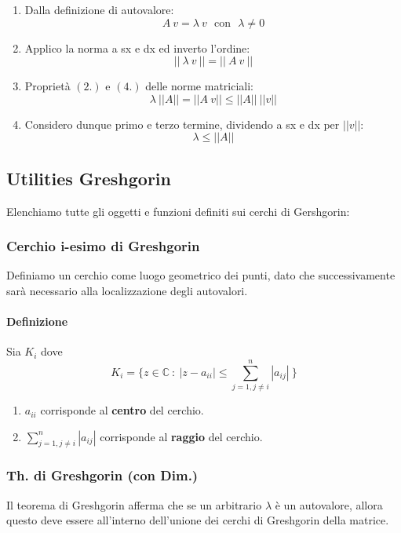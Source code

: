 \documentclass{article}
\begin{document}
\begin{enumerate}
    \item Dalla definizione di autovalore:
    \[ A\:v = \lambda\:v \:\:\: \text{con} \:\:\: \lambda \neq0\]
    \item Applico la norma a sx e dx ed inverto l'ordine:
    \[ ||\:\lambda\:v\:|| = ||\:A\:v\:||\]
    \item Proprietà $(2.)$ e $(4.)$ delle norme matriciali:
    \[ \lambda\:||A|| = ||A\:v|| \leq ||A|| \:|| v || \]
    \item Considero dunque primo e terzo termine, dividendo a sx e dx per $||v||$:
    \[ \boxed{\lambda \leq ||A||} \]
\end{enumerate}

\newpage

\subsection{Utilities Greshgorin}

Elenchiamo tutte gli oggetti e funzioni definiti sui cerchi di Gershgorin:

\subsubsection{Cerchio i-esimo di Greshgorin}

Definiamo un cerchio come luogo geometrico dei punti, dato che successivamente sarà necessario alla localizzazione degli autovalori.

\paragraph{Definizione} Sia $K_{i}$ dove
\[ \boxed{K_{i} = \{ z \in \mathbb{C} \: : \: |z-a_{ii}| \leq \sum_{j=1, j\neq i}^{n}|a_{ij}|  \: \} }\]

\begin{enumerate}
    \item $a_{ii}$ corrisponde al \textbf{centro} del cerchio.
    \item $\sum_{j=1, j\neq i}^{n}|a_{ij}|$ corrisponde al \textbf{raggio} del cerchio.
\end{enumerate}

\subsubsection{Th. di Greshgorin (con Dim.)}

Il teorema di Greshgorin afferma che se un arbitrario $\lambda$ è un autovalore, allora questo deve essere all'interno dell'unione dei cerchi di Greshgorin della matrice.
\end{document}
